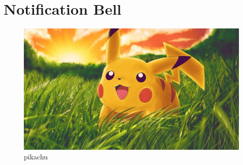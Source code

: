 \section{Notification Bell}

\begin{figure}[H]
    \centering
    \includegraphics[width = \textwidth ]{images/c}
    \caption{pikachu}
    \label{ash}
\end{figure}